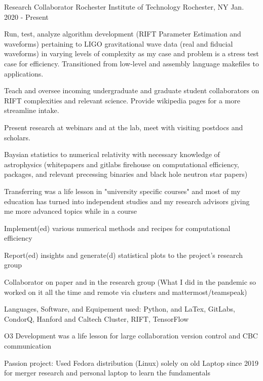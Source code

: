 \begin{cventries}

    \cventry
    {Research Collaborator}
    {Rochester Institute of Technology}
    {Rochester, NY}
    {Jan. 2020 - Present}
    {
      \begin{cvitems}
        \item {Run, test, analyze algorithm development (RIFT Parameter Estimation and waveforms) pertaining to LIGO gravitational wave data (real and fiducial waveforms) in varying levels of complexity as my case and problem is a stress test case for efficiency. Transitioned from low-level and assembly language makefiles to applications.}
        \item{Teach and oversee incoming undergraduate and graduate student collaborators on RIFT complexities and relevant science. Provide wikipedia pages for a more streamline intake.}
        \item{Present research at webinars and at the lab, meet with visiting postdocs and scholars.}
        \item{Baysian statistics to numerical relativity with necessary knowledge of astrophysics (whitepapers and gitlabs firehouse on computational efficiency, packages, and relevant precessing binaries and black hole neutron star papers)}
        \item{Transferring was a life lesson in "university specific courses" and most of my education has turned into independent studies and my research advisors giving me more advanced topics while in a course}
        \item{Implement(ed) various numerical methods and recipes for  computational efficiency}
        \item {Report(ed) insights and generate(d) statistical plots to the project's research group}
        \item {Collaborator on paper and in the research group (What I did in the pandemic so worked on it all the time and remote via clusters and mattermost/teamspeak)}
        \item {Languages, Software, and Equipement used: Python, and LaTex, GitLabs, CondorQ, Hanford and Caltech Cluster, RIFT, TensorFlow}
        \item{O3 Development was a life lesson for large collaboration version control and CBC communication}
        \item{Passion project: Used Fedora distribution (Linux) solely on old Laptop since 2019 for merger research and personal laptop to learn the fundamentals}

\end{cvitems}}
\end{cventries}
